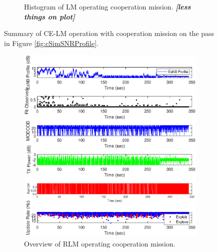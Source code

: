 \begin{figure}[ht!]
\begin{subfigure}{\linewidth}
	\caption{Histogram of LM operating cooperation mission. \textit{\textbf{[less things on plot]}}}
	\label{fig:cSimLMHists}
\end{subfigure}
\caption{Summary of CE-LM operation with cooperation mission on the pass in Figure \ref{fig:cSimSNRProfile}.}
\label{fig:c22LMCoop}
\end{figure}

\begin{figure}[ht!]
\centering
\begin{subfigure}{\linewidth}
	\centering
	\includegraphics[scale=0.5]{figures/c_sim_results/sim22_RLM_overview_coop.eps}
	\caption{Overview of RLM operating cooperation mission.}
	\label{fig:cSimLMOverview}
\end{subfigure}\\
\begin{subfigure}{\linewidth}
	\centering

\end{subfigure}
\end{figure}
